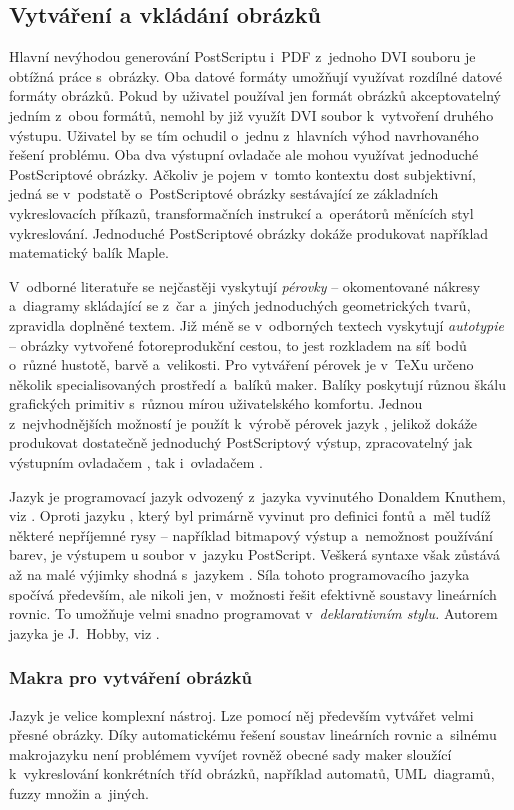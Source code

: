 \documentclass[12pt]{article}
\begin{document}
\subsection{Vytváření a vkládání obrázků}\label{mpost}
Hlavní nevýhodou generování PostScriptu i~PDF z~jednoho DVI souboru je obtížná
práce s~obrázky. Oba datové formáty umožňují využívat rozdílné datové formáty
obrázků. Pokud by uživatel používal jen formát obrázků akceptovatelný
jedním z~obou formátů, nemohl by již využít DVI soubor k~vytvoření druhého
výstupu. Uživatel by se tím ochudil o~jednu z~hlavních výhod navrhovaného 
řešení problému. Oba dva výstupní ovladače ale mohou využívat 
jednoduché PostScriptové obrázky. 
Ačkoliv je pojem  v~tomto kontextu dost subjektivní,
jedná se v~podstatě o~PostScriptové obrázky sestávající ze základních
vykreslovacích příkazů, transformačních instrukcí a~operátorů měnících
styl vykreslování. Jednoduché PostScriptové obrázky dokáže produkovat například
matematický balík Maple.

\medskip
V~odborné literatuře se nejčastěji vyskytují 
\emph{pérovky} -- okomentované nákresy a~diagramy skládající
se z~čar a~jiných jednoduchých geometrických tvarů, zpravidla doplněné textem.
Již méně se v~odborných textech vyskytují \emph{autotypie}
-- obrázky vytvořené fotoreprodukční cestou, to jest rozkladem na síť bodů
o~různé hustotě, barvě a~velikosti. Pro vytváření pérovek je v~\TeX u určeno
několik specialisovaných prostředí a~balíků maker. Balíky poskytují různou
škálu grafických primitiv s~různou mírou uživatelského komfortu. Jednou
z~nejvhodnějších možností je použít k~výrobě pérovek jazyk \MP, jelikož dokáže
produkovat dostatečně jednoduchý PostScriptový výstup, zpracovatelný jak 
výstupním ovladačem , tak i~ovladačem .

\medskip
Jazyk \MP{} je programovací jazyk odvozený
z~jazyka \MF{} vyvinutého Donaldem Knuthem, viz \cite{mfbook}.
Oproti jazyku \MF,
který byl primárně vyvinut pro definici fontů 
a~měl tudíž některé nepříjemné rysy -- například bitmapový výstup 
a~nemožnost používání barev, je výstupem \MP u soubor v~jazyku PostScript. 
Veškerá syntaxe však zůstává až na malé výjimky shodná s~jazykem \MF.
Síla tohoto programovacího jazyka spočívá především, ale nikoli jen,
v~možnosti řešit efektivně soustavy lineárních rovnic.
To umožňuje velmi snadno programovat v~\emph{deklarativním stylu.}
Autorem jazyka \MP{} je J.~Hobby, viz \cite{hobby}.

\subsubsection*{Makra pro vytváření obrázků}
Jazyk \MP{} je velice komplexní nástroj. Lze pomocí něj především vytvářet
velmi přesné obrázky. Díky automatickému řešení soustav lineárních rovnic
a~silnému makrojazyku není problémem vyvíjet rovněž obecné sady maker sloužící
k~vykreslování konkrétních tříd obrázků, například automatů, UML~diagramů,
fuzzy množin a~jiných.
\end{document}
